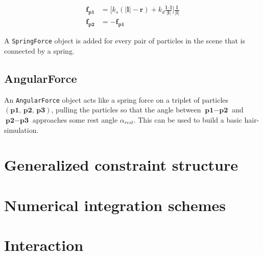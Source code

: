 \documentclass[a4paper,twoside,11pt,twocolumn]{article}
\begin{document}
\begin{align} \label{springforce}
	\mathbf{f_{p1}} &= \bigg[k_s(|\mathbf{l}| - \mathbf{r}) + k_d \frac{\dot{\mathbf{l}}\cdot \mathbf{l}}{|\mathbf{l}|}\bigg]\frac{\mathbf{l}}{|\mathbf{l}|}\\
	\mathbf{f_{p2}} &= -\mathbf{f_{p1}}
\end{align}

A \texttt{SpringForce} object is added for every pair of particles in the scene that is connected by a spring.

\subsection{AngularForce}
An \texttt{AngularForce} object acts like a spring force on a triplet of particles $(\textbf{p1, p2, p3})$, pulling the particles so that the angle between $\textbf{p1} - \textbf{p2}$ and $\textbf{p2} - \textbf{p3}$ approaches some rest angle $\alpha_{rest}$. This can be used to build a basic hair-simulation.

\section{Generalized constraint structure}

\section{Numerical integration schemes}
\label{Numerical_schemes}

\section{Interaction}
\end{document}
